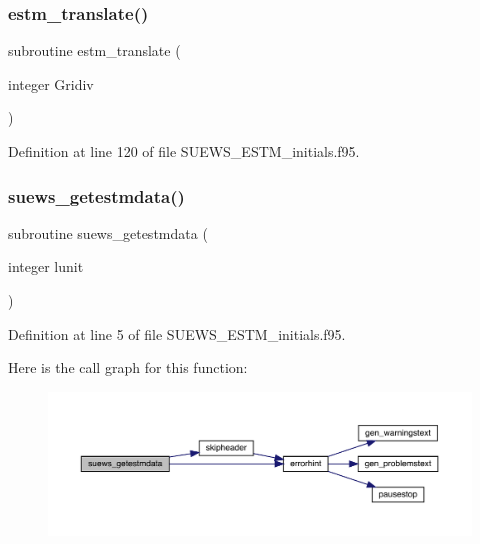 \mbox{\label{_s_u_e_w_s___e_s_t_m__initials_8f95_a64bd0feca17210d10f1019b759141cfb}} 
\subsubsection{\texorpdfstring{estm\+\_\+translate()}{estm\_translate()}}
{\footnotesize\ttfamily subroutine estm\+\_\+translate (\begin{DoxyParamCaption}\item[{integer}]{Gridiv }\end{DoxyParamCaption})}



Definition at line 120 of file S\+U\+E\+W\+S\+\_\+\+E\+S\+T\+M\+\_\+initials.\+f95.

\mbox{\label{_s_u_e_w_s___e_s_t_m__initials_8f95_afc2c99adf0020c7992fb803d9d9f1c45}} 
\subsubsection{\texorpdfstring{suews\+\_\+getestmdata()}{suews\_getestmdata()}}
{\footnotesize\ttfamily subroutine suews\+\_\+getestmdata (\begin{DoxyParamCaption}\item[{integer}]{lunit }\end{DoxyParamCaption})}



Definition at line 5 of file S\+U\+E\+W\+S\+\_\+\+E\+S\+T\+M\+\_\+initials.\+f95.

Here is the call graph for this function\+:\nopagebreak
\begin{figure}[H]
\begin{center}
\leavevmode
\includegraphics[width=350pt]{_s_u_e_w_s___e_s_t_m__initials_8f95_afc2c99adf0020c7992fb803d9d9f1c45_cgraph}
\end{center}
\end{figure}
